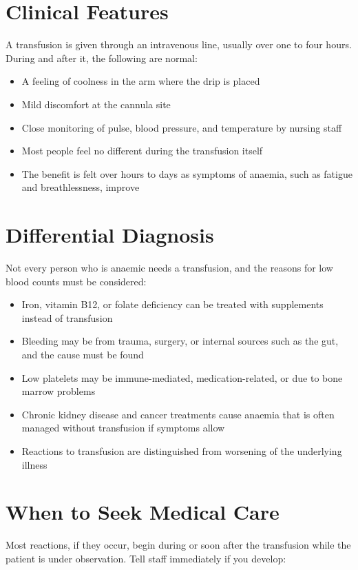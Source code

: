 \section*{Clinical Features}
A transfusion is given through an intravenous line, usually over one to four hours. During and after it, the following are normal:

\begin{itemize}
    \item A feeling of coolness in the arm where the drip is placed
    \item Mild discomfort at the cannula site
    \item Close monitoring of pulse, blood pressure, and temperature by nursing staff
    \item Most people feel no different during the transfusion itself
    \item The benefit is felt over hours to days as symptoms of anaemia, such as fatigue and breathlessness, improve
\end{itemize}

\section*{Differential Diagnosis}
Not every person who is anaemic needs a transfusion, and the reasons for low blood counts must be considered:

\begin{itemize}
    \item Iron, vitamin B12, or folate deficiency can be treated with supplements instead of transfusion
    \item Bleeding may be from trauma, surgery, or internal sources such as the gut, and the cause must be found
    \item Low platelets may be immune-mediated, medication-related, or due to bone marrow problems
    \item Chronic kidney disease and cancer treatments cause anaemia that is often managed without transfusion if symptoms allow
    \item Reactions to transfusion are distinguished from worsening of the underlying illness
\end{itemize}

\section*{When to Seek Medical Care}
Most reactions, if they occur, begin during or soon after the transfusion while the patient is under observation. Tell staff immediately if you develop:

